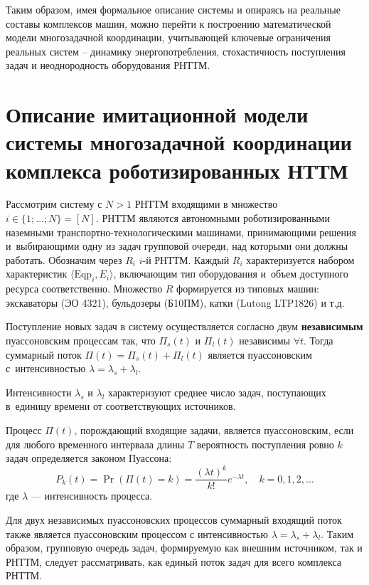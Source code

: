 Таким образом, имея формальное описание системы и опираясь на реальные
составы комплексов машин, можно перейти к построению математической модели
многозадачной координации, учитывающей ключевые ограничения реальных
систем -- динамику энергопотребления, стохастичность поступления задач и
неоднородность оборудования РНТТМ.

\section{Описание имитационной модели системы многозадачной координации комплекса роботизированных НТТМ}\label{sec:ch2/sec1}

Рассмотрим систему с $N>1$ РНТТМ входящими в множество $i \in \{ 1; \dotsc; N \} = [N]$. РНТТМ являются автономными роботизированными наземными транспортно-технологическими машинами, принимающими решения и~выбирающими одну из задач групповой очереди, над которыми они должны работать. Обозначим через $R_i$ $i$-й РНТТМ. Каждый $R_i$ характеризуется набором характеристик $\langle \text{Eqp}_i, E_i \rangle$, включающим тип оборудования и~объем доступного ресурса соответственно. Множество $R$ формируется из типовых машин: экскаваторы (ЭО 4321), бульдозеры (Б10ПМ), катки (Lutong LTP1826) и т.д.

Поступление новых задач в систему осуществляется согласно двум \textbf{независимым} пуассоновским процессам так, что $\Pi_s(t)$ и $\Pi_l(t)$ независимы $\forall t$. Тогда суммарный поток $\Pi(t) = \Pi_s(t) + \Pi_l(t)$ является пуассоновским с~интенсивностью $\lambda = \lambda_s + \lambda_l$.

Интенсивности $\lambda_s$ и $\lambda_l$ характеризуют среднее число задач, поступающих в~единицу времени от соответствующих источников.

Процесс $\Pi(t)$, порождающий входящие задачи, является пуассоновским, если для любого временного интервала длины $T$ вероятность поступления ровно $k$ задач определяется законом Пуассона:
\begin{equation}
	\label{eq:queue_puasson}
	P_k(t) = \Pr\left(\Pi(t) = k\right) = \frac{(\lambda t)^k}{k!} e^{-\lambda t}, \quad k = 0, 1, 2, \dotsc
\end{equation}
где $\lambda$ — интенсивность процесса.

Для двух независимых пуассоновских процессов суммарный входящий поток также является пуассоновским процессом с интенсивностью $\lambda = \lambda_s + \lambda_l$. Таким образом, групповую очередь задач, формируемую как внешним источником, так и РНТТМ, следует рассматривать, как единый поток задач для всего комплекса РНТТМ.

